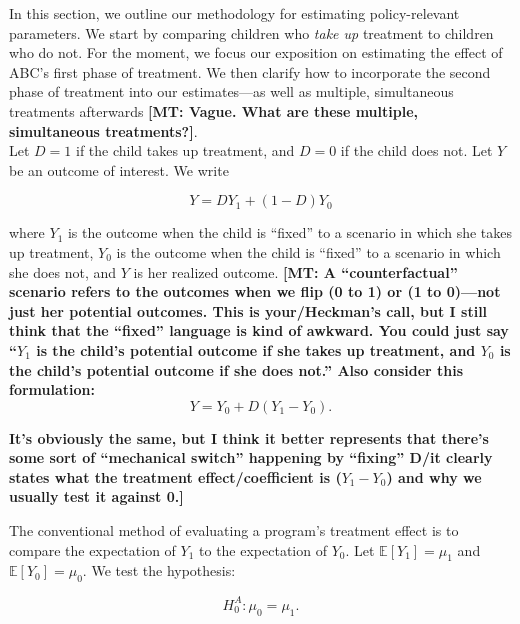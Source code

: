 \noindent In this section, we outline our methodology for estimating policy-relevant parameters. We start by comparing children who \textit{take up} treatment to children who do not. For the moment, we focus our exposition on estimating the effect of ABC's first phase of treatment. We then clarify how to incorporate the second phase of treatment into our estimates---as well as multiple, simultaneous treatments afterwards \textbf{[MT: Vague. What are these multiple, simultaneous treatments?]}.\\

\noindent Let $D = 1$ if the child takes up treatment, and $D=0$ if the child does not. Let $Y$ be an outcome of interest. We write

\begin{equation}
Y = D Y_{1} + \left( 1 - D \right) Y_{0} \label{eq:outcome}
\end{equation}

\noindent where $Y_{1}$ is the outcome when the child is ``fixed'' to a scenario in which she takes up treatment, $Y_{0}$ is the outcome when the child is ``fixed'' to a scenario in which she does not, and $Y$ is her realized outcome. \textbf{[MT: A ``counterfactual'' scenario refers to the outcomes when we flip (0 to 1) or (1 to 0)---not just her potential outcomes. This is your/Heckman's call, but I still think that the ``fixed'' language is kind of awkward. You could just say ``$Y_{1}$ is the child's potential outcome if she takes up treatment, and $Y_{0}$ is the child's potential outcome if she does not.'' Also consider this formulation:} \begin{equation}
Y = Y_{0} + D \left (Y_{1} - Y_{0} \right ). \nonumber 
\end{equation}

\textbf{It's obviously the same, but I think it better represents that there's some sort of ``mechanical switch'' happening by ``fixing'' D/it clearly states what the treatment effect/coefficient is ($Y_{1} - Y_{0}$) and why we usually test it against 0.]}

\noindent The conventional method of evaluating a program's treatment effect is to compare the expectation of $Y_{1}$ to the expectation of $Y_{0}$. Let $\mathbb{E} \left[ Y_{1} \right] = \mu_{1}$ and $\mathbb{E} \left[ Y_{0} \right] = \mu_{0}$. We test the hypothesis:

\begin{equation}
H_{0}^A: \mu_{0} = \mu_{1}. \label{eq:ho}
\end{equation}

